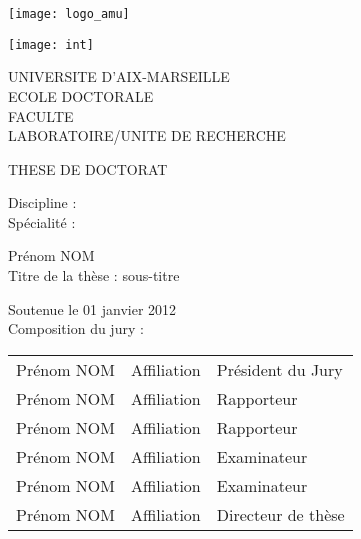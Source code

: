 \titlepage
{}\selectfont{}
\vspace*{-2cm}
\begin{center}
	\begin{minipage}[c]{0.25\linewidth}
		\raggedright \texttt{[image: logo\_amu]}
	\end{minipage}\hfill
	\begin{minipage}[c]{0.25\linewidth}
		\raggedleft \texttt{[image: int]}
	\end{minipage}\hfill 
\end{center}
\begin{flushleft}
        \vspace{0.2cm}
    \LARGE UNIVERSITE D’AIX-MARSEILLE\\
        \vspace{0.2cm}
    \Large ECOLE DOCTORALE\\
        \vspace{0.2cm}
    \normalsize FACULTE\\
        \vspace{0.2cm}
    LABORATOIRE/UNITE DE RECHERCHE\\
    \begin{center}
        \vspace{2cm}
    THESE DE DOCTORAT\\
    \end{center}
        \vspace{0.5cm}
    Discipline :\\
    Spécialité :\\
    \begin{center}
        \vspace{0.5cm}
    \Large Prénom NOM\\
        \vspace{1cm}
    \large Titre de la thèse : sous-titre\\
    \end{center}
        \vspace{3cm}
    \normalsize Soutenue le 01 janvier 2012\\
        \vspace{0.4cm}
    Composition du jury :\\
\end{flushleft}
\vspace{0.4cm}
\begin{tabular}{lll}
Prénom NOM & Affiliation & Président du Jury \\
    \vspace{0.08cm}
Prénom NOM & Affiliation & Rapporteur \\
    \vspace{0.08cm}
Prénom NOM & Affiliation & Rapporteur \\
    \vspace{0.08cm}
Prénom NOM & Affiliation & Examinateur \\
    \vspace{0.08cm}
Prénom NOM & Affiliation & Examinateur \\
    \vspace{0.08cm}
Prénom NOM & Affiliation & Directeur de thèse \\
\end{tabular}
\selectfont{}